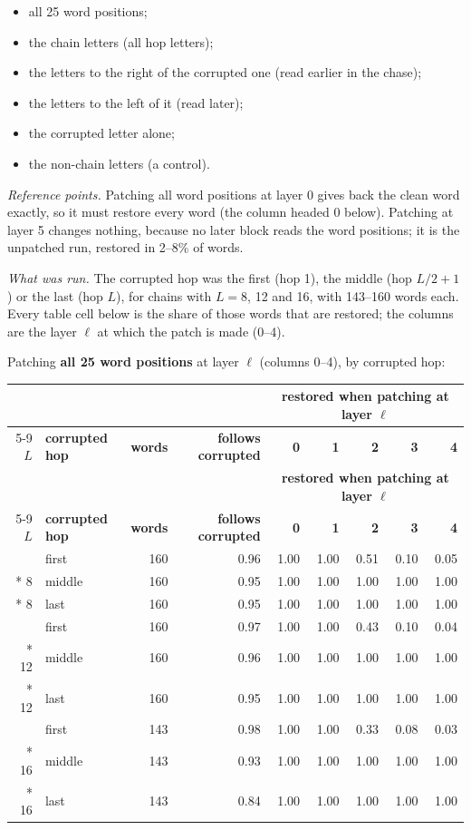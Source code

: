 \documentclass[paper=a4,fontsize=11pt,DIV=11,parskip=half,headings=small,numbers=noendperiod]{scrartcl}
\DeclareRobustCommand{\hdr}[1]{\textsf{\bfseries #1}}
\begin{document}
\begin{itemize}
\item all 25 word positions;
\item the chain letters (all hop letters);
\item the letters to the right of the corrupted one (read earlier in the chase);
\item the letters to the left of it (read later);
\item the corrupted letter alone;
\item the non-chain letters (a control).
\end{itemize}

\emph{Reference points.} Patching all word positions at layer 0 gives back the clean word exactly, so it must
restore every word (the column headed 0 below). Patching at layer 5 changes nothing, because no later block
reads the word positions; it is the unpatched run, restored in 2–8\% of words.

\emph{What was run.} The corrupted hop was the first (hop 1), the middle (hop $L/2+1$) or the last (hop $L$),
for chains with $L=8$, 12 and 16, with 143–160 words each. Every table cell below is the share of those words
that are restored; the columns are the layer $\ell$ at which the patch is made (0–4).

Patching \textbf{all 25 word positions} at layer $\ell$ (columns 0–4), by corrupted
hop:

{\small\nopagebreak[4]
\begin{longtable}{@{}r l r r *{5}{r}@{}}
\toprule
& & & & \multicolumn{5}{c}{\hdr{restored when patching at layer $\ell$}} \\
\cmidrule(lr){5-9}
\hdr{$L$} & \hdr{corrupted hop} & \hdr{words} & \hdr{follows corrupted} & \hdr{0} & \hdr{1} & \hdr{2} & \hdr{3} & \hdr{4} \\
\midrule
\endfirsthead
\toprule
& & & & \multicolumn{5}{c}{\hdr{restored when patching at layer $\ell$}} \\
\cmidrule(lr){5-9}
\hdr{$L$} & \hdr{corrupted hop} & \hdr{words} & \hdr{follows corrupted} & \hdr{0} & \hdr{1} & \hdr{2} & \hdr{3} & \hdr{4} \\
\midrule
\endhead
\bottomrule
\endlastfoot
8 & first & 160 & 0.96 & 1.00 & 1.00 & 0.51 & 0.10 & 0.05 \\*
8 & middle & 160 & 0.95 & 1.00 & 1.00 & 1.00 & 1.00 & 1.00 \\*
8 & last & 160 & 0.95 & 1.00 & 1.00 & 1.00 & 1.00 & 1.00 \\
\addlinespace[4pt]
12 & first & 160 & 0.97 & 1.00 & 1.00 & 0.43 & 0.10 & 0.04 \\*
12 & middle & 160 & 0.96 & 1.00 & 1.00 & 1.00 & 1.00 & 1.00 \\*
12 & last & 160 & 0.95 & 1.00 & 1.00 & 1.00 & 1.00 & 1.00 \\
\addlinespace[4pt]
16 & first & 143 & 0.98 & 1.00 & 1.00 & 0.33 & 0.08 & 0.03 \\*
16 & middle & 143 & 0.93 & 1.00 & 1.00 & 1.00 & 1.00 & 1.00 \\*
16 & last & 143 & 0.84 & 1.00 & 1.00 & 1.00 & 1.00 & 1.00 \\
\end{longtable}}
\end{document}
